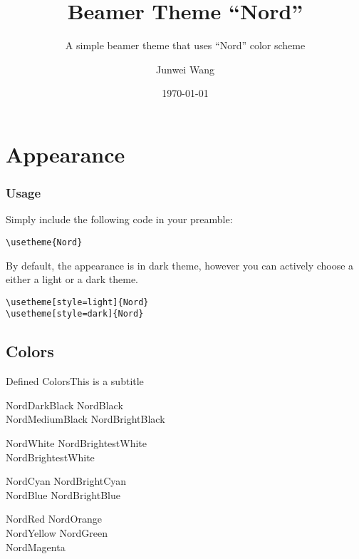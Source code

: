 \documentclass[compress]{beamer}
\title{Beamer Theme ``Nord''}
\subtitle{A simple beamer theme that uses ``Nord'' color scheme}
\author{Junwei Wang}
\institute{CryptoExperts}
\date{\today}
\begin{document}
\begin{frame}
  \maketitle
\end{frame}


\section{Appearance}


\begin{frame}[fragile]
  \frametitle{Usage}
  Simply include the following code in your preamble:

  \begin{lstlisting}[basicstyle = \ttfamily\small]
\usetheme{Nord}
  \end{lstlisting}

  \bigskip

  By default, the appearance is in dark theme, however you can actively choose a either a light or a
  dark theme.

  \begin{lstlisting}[basicstyle = \ttfamily\small]
\usetheme[style=light]{Nord}
\usetheme[style=dark]{Nord}
  \end{lstlisting}

\end{frame}

\subsection{Colors}

\begin{frame}{Defined Colors}{This is a subtitle}
  \begin{description}
  \item[Polar Night]
    \textcolor{NordDarkBlack}{NordDarkBlack} \quad \textcolor{NordBlack}{NordBlack}\\
    \textcolor{NordMediumBlack}{NordMediumBlack} \quad \textcolor{NordBrightBlack}{NordBrightBlack}
  \item[Snow Storm]
    \textcolor{NordWhite}{NordWhite} \quad \textcolor{NordBrighterWhite}{NordBrightestWhite}\\
    \textcolor{NordBrightestWhite}{NordBrightestWhite}
  \item[Forest]
    \textcolor{NordCyan}{NordCyan} \quad \textcolor{NordBrightCyan}{NordBrightCyan}\\
    \textcolor{NordBlue}{NordBlue} \quad \textcolor{NordBrightBlue}{NordBrightBlue}
  \item[Aurora]
    \textcolor{NordRed}{NordRed} \quad \textcolor{NordOrange}{NordOrange} \\
    \textcolor{NordYellow}{NordYellow} \quad \textcolor{NordGreen}{NordGreen} \\
    \textcolor{NordMagenta}{NordMagenta}
  \end{description}
\end{frame}
\end{document}
